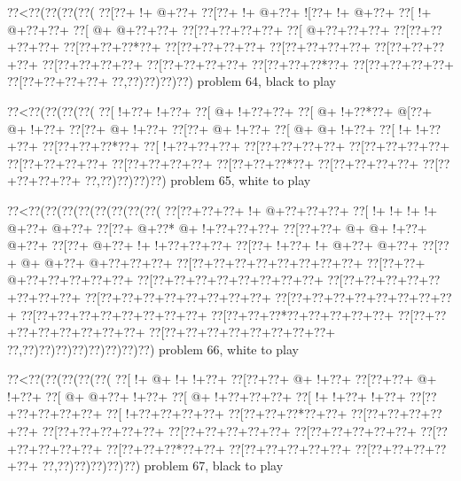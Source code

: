 \vbox{\vbox{\goo
\0??<\0??(\0??(\0??(\0??(
\0??[\0??+\- !+\- @+\0??+
\0??[\0??+\- !+\- @+\0??+
\- ![\0??+\- !+\- @+\0??+
\0??[\- !+\- @+\0??+\0??+
\0??[\- @+\- @+\0??+\0??+
\0??[\0??+\0??+\0??+\0??+
\0??[\- @+\0??+\0??+\0??+
\0??[\0??+\0??+\0??+\0??+
\0??[\0??+\0??+\0??*\0??+
\0??[\0??+\0??+\0??+\0??+
\0??[\0??+\0??+\0??+\0??+
\0??[\0??+\0??+\0??+\0??+
\0??[\0??+\0??+\0??+\0??+
\0??[\0??+\0??+\0??+\0??+
\0??[\0??+\0??+\0??*\0??+
\0??[\0??+\0??+\0??+\0??+
\0??[\0??+\0??+\0??+\0??+
\0??,\0??)\0??)\0??)\0??)
}
\hfil problem 64, black to play\hfil\break
}

\vbox{\vbox{\goo
\0??<\0??(\0??(\0??(\0??(
\0??[\- !+\0??+\- !+\0??+
\0??[\- @+\- !+\0??+\0??+
\0??[\- @+\- !+\0??*\0??+
\- @[\0??+\- @+\- !+\0??+
\0??[\0??+\- @+\- !+\0??+
\0??[\0??+\- @+\- !+\0??+
\0??[\- @+\- @+\- !+\0??+
\0??[\- !+\- !+\0??+\0??+
\0??[\0??+\0??+\0??*\0??+
\0??[\- !+\0??+\0??+\0??+
\0??[\0??+\0??+\0??+\0??+
\0??[\0??+\0??+\0??+\0??+
\0??[\0??+\0??+\0??+\0??+
\0??[\0??+\0??+\0??+\0??+
\0??[\0??+\0??+\0??*\0??+
\0??[\0??+\0??+\0??+\0??+
\0??[\0??+\0??+\0??+\0??+
\0??,\0??)\0??)\0??)\0??)
}
\hfil problem 65, white to play\hfil\break
}

\vbox{\vbox{\goo
\0??<\0??(\0??(\0??(\0??(\0??(\0??(\0??(\0??(
\0??[\0??+\0??+\0??+\- !+\- @+\0??+\0??+\0??+
\0??[\- !+\- !+\- !+\- !+\- @+\0??+\- @+\0??+
\0??[\0??+\- @+\0??*\- @+\- !+\0??+\0??+\0??+
\0??[\0??+\0??+\- @+\- @+\- !+\0??+\- @+\0??+
\0??[\0??+\- @+\0??+\- !+\- !+\0??+\0??+\0??+
\0??[\0??+\- !+\0??+\- !+\- @+\0??+\- @+\0??+
\0??[\0??+\- @+\- @+\0??+\- @+\0??+\0??+\0??+
\0??[\0??+\0??+\0??+\0??+\0??+\0??+\0??+\0??+
\0??[\0??+\0??+\- @+\0??+\0??+\0??+\0??+\0??+
\0??[\0??+\0??+\0??+\0??+\0??+\0??+\0??+\0??+
\0??[\0??+\0??+\0??+\0??+\0??+\0??+\0??+\0??+
\0??[\0??+\0??+\0??+\0??+\0??+\0??+\0??+\0??+
\0??[\0??+\0??+\0??+\0??+\0??+\0??+\0??+\0??+
\0??[\0??+\0??+\0??+\0??+\0??+\0??+\0??+\0??+
\0??[\0??+\0??+\0??*\0??+\0??+\0??+\0??+\0??+
\0??[\0??+\0??+\0??+\0??+\0??+\0??+\0??+\0??+
\0??[\0??+\0??+\0??+\0??+\0??+\0??+\0??+\0??+
\0??,\0??)\0??)\0??)\0??)\0??)\0??)\0??)\0??)
}
\hfil problem 66, white to play\hfil\break
}

\vbox{\vbox{\goo
\0??<\0??(\0??(\0??(\0??(\0??(
\0??[\- !+\- @+\- !+\- !+\0??+
\0??[\0??+\0??+\- @+\- !+\0??+
\0??[\0??+\0??+\- @+\- !+\0??+
\0??[\- @+\- @+\0??+\- !+\0??+
\0??[\- @+\- !+\0??+\0??+\0??+
\0??[\- !+\- !+\0??+\- !+\0??+
\0??[\0??+\0??+\0??+\0??+\0??+
\0??[\- !+\0??+\0??+\0??+\0??+
\0??[\0??+\0??+\0??*\0??+\0??+
\0??[\0??+\0??+\0??+\0??+\0??+
\0??[\0??+\0??+\0??+\0??+\0??+
\0??[\0??+\0??+\0??+\0??+\0??+
\0??[\0??+\0??+\0??+\0??+\0??+
\0??[\0??+\0??+\0??+\0??+\0??+
\0??[\0??+\0??+\0??*\0??+\0??+
\0??[\0??+\0??+\0??+\0??+\0??+
\0??[\0??+\0??+\0??+\0??+\0??+
\0??,\0??)\0??)\0??)\0??)\0??)
}
\hfil problem 67, black to play\hfil\break
}

